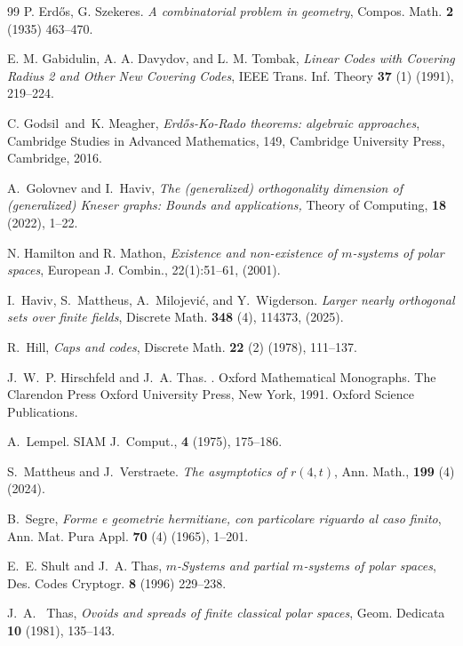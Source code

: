 \documentclass[a4paper,11pt]{amsproc}
\theoremstyle{plain}
\theoremstyle{definition}
\newcommand{\<}{\langle}
\renewcommand{\>}{\rangle} %
\begin{document}
\begin{thebibliography}{99}
P. Erd{\H{o}}s, G. Szekeres. {\it A combinatorial problem in geometry}, Compos. Math. {\bf 2} (1935) 463--470.

 E. M. Gabidulin, A. A. Davydov, and L. M. Tombak, {\em Linear Codes with Covering Radius 2 and Other New Covering Codes}, IEEE Trans. Inf. Theory {\bf 37} (1) (1991), 219--224.

C. Godsil\ and\ K. Meagher, {\it Erd\H{o}s-Ko-Rado theorems: algebraic approaches}, Cambridge Studies in Advanced Mathematics, 149, Cambridge University Press, Cambridge, 2016. 

A.~Golovnev and I.~Haviv,
{\it The (generalized) orthogonality dimension of (generalized) {K}neser graphs: Bounds and applications,}
Theory of Computing, {\bf 18} (2022), 1--22.

N. Hamilton and R. Mathon,
{\it Existence and non-existence of {$m$}-systems of polar spaces},
European J. Combin., 22(1):51--61, (2001).

I.~Haviv, S.~Mattheus, A.~Milojevi\'c, and Y.~Wigderson. 
{\it Larger nearly orthogonal sets over finite fields}, 
Discrete Math. {\bf 348} (4), 114373, (2025).


R.~Hill,
{\it Caps and codes},
Discrete Math. {\bf 22} (2) (1978), 111--137.

J.~W.~P. Hirschfeld and J.~A. Thas.
.
\newblock Oxford Mathematical Monographs. The Clarendon Press Oxford University
  Press, New York, 1991.
\newblock Oxford Science Publications.

A.~Lempel. 
\newblock SIAM J.~Comput., {\bf 4} (1975), 175--186.


S.~Mattheus and J.~Verstraete. 
{\it The asymptotics of $r(4, t)$},
Ann. Math., {\bf 199} (4) (2024).


B.~Segre,
{\it Forme e geometrie hermitiane, con particolare riguardo al caso finito},
Ann. Mat. Pura Appl. {\bf 70} (4) (1965), 1--201.

E.~E. Shult and J.~A. Thas,
{\it $m$-Systems and partial $m$-systems of polar spaces},
Des. Codes Cryptogr. {\bf 8} (1996) 229--238.

J.~A.~ Thas,
{\it Ovoids and spreads of finite classical polar spaces}, 
Geom. Dedicata {\bf 10} (1981), 135--143.


\end{thebibliography}
\end{document}
